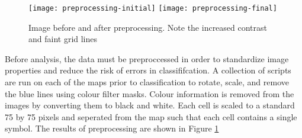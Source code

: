\begin{figure}[h]
    \begin{center}
    \texttt{[image: preprocessing-initial]}
    \texttt{[image: preprocessing-final]}
    \label{figure:preprocess}
    \caption{Image before and after preprocessing. Note the increased contrast and faint grid lines}
    \end{center}
\end{figure}

Before analysis, the data must be preproccessed in order to standardize image
properties and reduce the risk of errors in classififcation. A collection of
scripts are run on each of the maps prior to classification to rotate, scale,
and remove the blue lines using colour filter masks.  Colour information is
removed from the images by converting them to black and white. Each cell is
scaled to a standard 75 by 75 pixels and seperated from the map such that each
cell contains a single symbol.  The results of preprocessing are shown in
Figure \ref{figure:preprocess}

